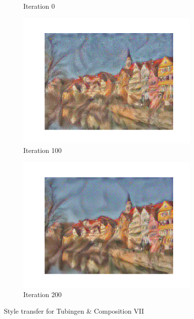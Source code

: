 \documentclass[12pt]{article}
\begin{document}
\begin{figure}[htbp]
\begin{subfigure}[t]{0.48\textwidth}
        \caption{Iteration 0}
    \label{hw2p2b}
    \end{subfigure}
    \begin{subfigure}[t]{0.48\textwidth}
        \centering
        \includegraphics[trim={3in 0in 3in 0in},scale=0.5]{./Homework2/output/hw2p2_fig03.png}
        \caption{Iteration 100}
    \label{hw2p2c}
    \end{subfigure}
    \begin{subfigure}[t]{0.48\textwidth}
        \centering
        \includegraphics[trim={3in 0in 3in 0in},scale=0.8]{./Homework2/output/hw2p2_fig04.png}
        \caption{Iteration 200}
    \label{hw2p2d}
    \end{subfigure}
    \caption{Style transfer for Tubingen \& Composition VII}
\end{figure}
\end{document}
